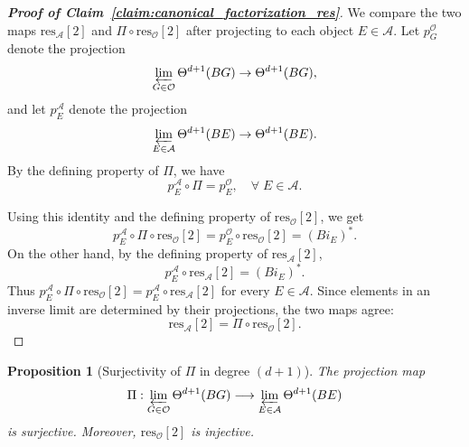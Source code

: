 \documentclass[aps,prx,reprint,superscriptaddress,twocolumn,amsmath,amssymb,amsfonts, nofootinbib]{revtex4-2}
\newcommand{\res}{\text{res}}
\theoremstyle{apsstyle}
\newtheorem{proposition}[theorem]{Proposition}
\begin{document}
\begin{proof}[\textnormal{\textbf{Proof of Claim~\ref{claim:canonical_factorization_res}}}]
We compare the two maps $\res_{\mathcal A}[2]$ and $\Pi\circ \res_{\mathcal O}[2]$ after projecting to each object $E\in\mathcal A$. Let $p_G^{\mathcal O}$ denote the projection
\begin{equation*}
\varprojlim_{G\in\mathcal O}\Theta^{d+1}(BG)\to \Theta^{d+1}(BG),
\end{equation*}
and let $p_E^{\mathcal A}$ denote the projection 
\begin{equation*}
\varprojlim_{E\in\mathcal A}\Theta^{d+1}(BE)\to \Theta^{d+1}(BE).
\end{equation*}
By the defining property of $\Pi$, we have
\begin{equation}
p_E^{\mathcal A}\circ \Pi = p_E^{\mathcal O}, \quad \forall \; E\in \mathcal{A}.
\end{equation}

\noindent Using this identity and the defining property of $\res_{\mathcal O}[2]$, we get
\begin{equation}
p_E^{\mathcal A}\circ \Pi\circ \res_{\mathcal O}[2]
=
p_E^{\mathcal O}\circ \res_{\mathcal O}[2]
=
(Bi_E)^*.
\end{equation}
On the other hand, by the defining property of $\res_{\mathcal A}[2]$,
\begin{equation}
p_E^{\mathcal A}\circ \res_{\mathcal A}[2]
=
(Bi_E)^*.
\end{equation}
Thus $p_E^{\mathcal A}\circ \Pi\circ \res_{\mathcal O}[2]
=
p_E^{\mathcal A}\circ \res_{\mathcal A}[2]$ for every $E\in\mathcal A$. Since elements in an inverse limit are determined by their projections, the two maps agree:
\begin{equation}
\res_{\mathcal A}[2]
=
\Pi\circ \res_{\mathcal O}[2].
\end{equation}
\end{proof}

\begin{proposition}[Surjectivity of $\Pi$ in degree $(d+1)$]
\label{prop:Pi_surjective}
The projection map
\begin{equation}
\Pi:
\varprojlim_{G\in\mathcal O}\Theta^{d+1}(BG)
\longrightarrow
\varprojlim_{E\in\mathcal A}\Theta^{d+1}(BE)
\end{equation}
is surjective. Moreover, $\res_{\mathcal O}[2]$ is injective.
\end{proposition}
\end{document}
